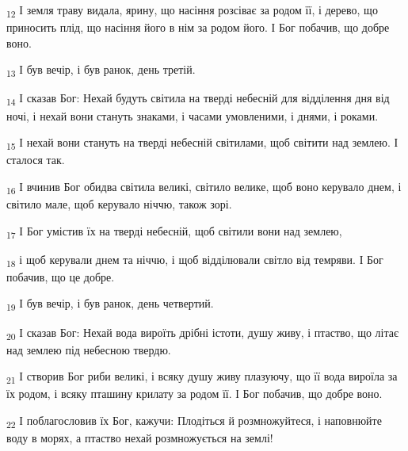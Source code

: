 \begin{tcolorbox}
\textsubscript{12} І земля траву видала, ярину, що насіння розсіває за родом її, і дерево, що приносить плід, що насіння його в нім за родом його. І Бог побачив, що добре воно.
\end{tcolorbox}
\begin{tcolorbox}
\textsubscript{13} І був вечір, і був ранок, день третій.
\end{tcolorbox}
\begin{tcolorbox}
\textsubscript{14} І сказав Бог: Нехай будуть світила на тверді небесній для відділення дня від ночі, і нехай вони стануть знаками, і часами умовленими, і днями, і роками.
\end{tcolorbox}
\begin{tcolorbox}
\textsubscript{15} І нехай вони стануть на тверді небесній світилами, щоб світити над землею. І сталося так.
\end{tcolorbox}
\begin{tcolorbox}
\textsubscript{16} І вчинив Бог обидва світила великі, світило велике, щоб воно керувало днем, і світило мале, щоб керувало ніччю, також зорі.
\end{tcolorbox}
\begin{tcolorbox}
\textsubscript{17} І Бог умістив їх на тверді небесній, щоб світили вони над землею,
\end{tcolorbox}
\begin{tcolorbox}
\textsubscript{18} і щоб керували днем та ніччю, і щоб відділювали світло від темряви. І Бог побачив, що це добре.
\end{tcolorbox}
\begin{tcolorbox}
\textsubscript{19} І був вечір, і був ранок, день четвертий.
\end{tcolorbox}
\begin{tcolorbox}
\textsubscript{20} І сказав Бог: Нехай вода вироїть дрібні істоти, душу живу, і птаство, що літає над землею під небесною твердю.
\end{tcolorbox}
\begin{tcolorbox}
\textsubscript{21} І створив Бог риби великі, і всяку душу живу плазуючу, що її вода вироїла за їх родом, і всяку пташину крилату за родом її. І Бог побачив, що добре воно.
\end{tcolorbox}
\begin{tcolorbox}
\textsubscript{22} І поблагословив їх Бог, кажучи: Плодіться й розмножуйтеся, і наповнюйте воду в морях, а птаство нехай розмножується на землі!
\end{tcolorbox}
